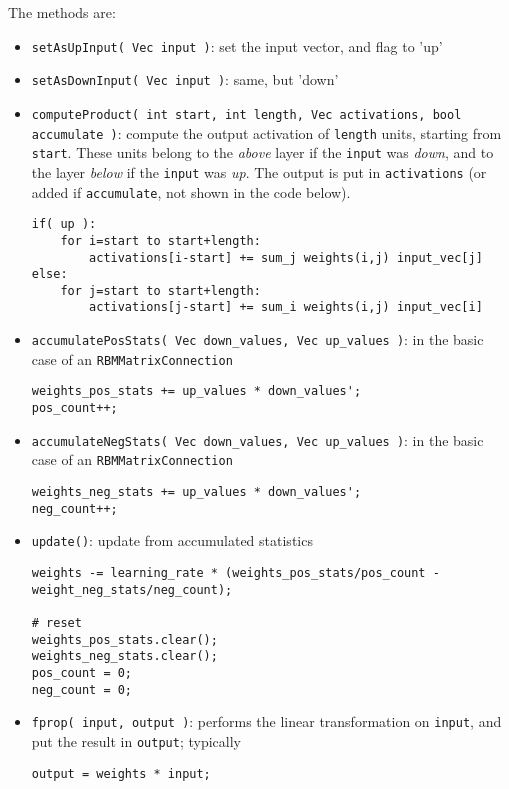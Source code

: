 \documentclass[11pt]{book}
\begin{document}
The methods are:
\begin{itemize}

    \item {\tt setAsUpInput( Vec input )}: set the input vector, and
    flag to 'up'

    \item {\tt setAsDownInput( Vec input )}: same, but 'down'

    \item {\tt computeProduct( int start, int length, Vec activations,
    bool accumulate )}: compute the output activation of {\tt length}
    units, starting from {\tt start}. These units belong to the {\em
    above} layer if the {\tt input} was {\em down}, and to the layer
    {\em below} if the {\tt input} was {\em up}. The output is put in
    {\tt activations} (or added if {\tt accumulate}, not shown in the
    code below).

\begin{verbatim}
if( up ):
    for i=start to start+length:
        activations[i-start] += sum_j weights(i,j) input_vec[j]
else:
    for j=start to start+length:
        activations[j-start] += sum_i weights(i,j) input_vec[i]
\end{verbatim}

    \item {\tt accumulatePosStats( Vec down\_values, Vec up\_values )}:
    in the basic case of an {\tt RBMMatrixConnection}

\begin{verbatim}
weights_pos_stats += up_values * down_values';
pos_count++;
\end{verbatim}

    \item {\tt accumulateNegStats( Vec down\_values, Vec up\_values )}:
    in the basic case of an {\tt RBMMatrixConnection}

\begin{verbatim}
weights_neg_stats += up_values * down_values';
neg_count++;
\end{verbatim}

    \item {\tt update()}: update from accumulated statistics

\begin{verbatim}
weights -= learning_rate * (weights_pos_stats/pos_count - weight_neg_stats/neg_count);

# reset
weights_pos_stats.clear();
weights_neg_stats.clear();
pos_count = 0;
neg_count = 0;
\end{verbatim}

    \item {\tt fprop( input, output )}: performs the linear
    transformation on {\tt input}, and put the result in {\tt output};
    typically

\begin{verbatim}
output = weights * input;
\end{verbatim}

\end{itemize}
\end{document}
